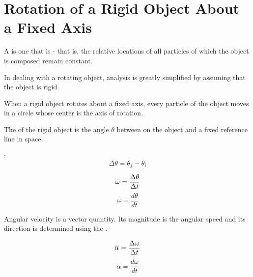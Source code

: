 \chapter{Rotation of a Rigid Object About a Fixed Axis}
        \par A  is one that is  - that is, the relative
        locations of all particles of which the object is composed remain constant.
        \par In dealing with a rotating object, analysis is greatly simplified by assuming that
        the object is rigid.
        \par When a rigid object rotates about a fixed axis, every particle of the object
        moves in a circle whose center is the axis of rotation.

            \par The  of the rigid object is the angle $\theta$ between
             on the object and a fixed reference line in space.

            :
            \begin{equation}
                \Delta \theta = \theta_{f} - \theta_{i}
            \end{equation}
        \hiiEND

                \begin{equation}
                    \overline{\omega} = \dfrac{\Delta \theta}{\Delta t}
                \end{equation}
                \begin{equation}
                    \omega = \dfrac{d \theta}{dt}
                \end{equation}
                \par Angular velocity is a vector quantity. Its magnitude is the angular speed
                and its direction is determined using the .
        \hiiEND

                \begin{equation}
                    \overline{\alpha} = \dfrac{\Delta \omega}{\Delta t}
                \end{equation}
                \begin{equation}
                    \alpha = \dfrac{d \omega}{dt}
                \end{equation}
        \hiiEND

